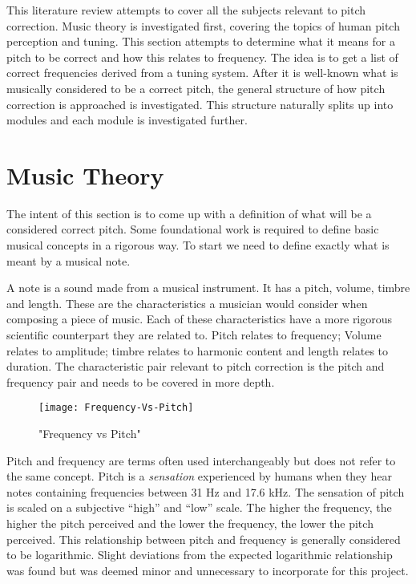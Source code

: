 
This literature review attempts to cover all the subjects relevant to pitch
correction. Music theory is investigated first, covering the topics of human pitch
perception and tuning. This section attempts to determine what it means for a
pitch to be correct and how this relates to frequency. The idea is to get a list
of correct frequencies derived from a tuning system. After it is well-known what
is musically considered to be a correct pitch, the general structure of how pitch
correction is approached is investigated. This structure naturally splits up into
modules and each module is investigated further.

\section{Music Theory}

The intent of this section is to come up with a definition of what will be a
considered correct pitch. Some foundational work is required to define basic
musical concepts in a rigorous way. To start we need to define exactly what is
meant by a musical note.

A note is a sound made from a musical instrument. It has a pitch, volume, timbre
and length. These are the characteristics a musician would consider when composing
a piece of music. Each of these characteristics have a more rigorous scientific
counterpart they are related to. Pitch relates to frequency; Volume relates to
amplitude; timbre relates to harmonic content and length relates to duration. The
characteristic pair relevant to pitch correction is the pitch and frequency pair
and needs to be covered in more depth.

\begin{wrapfigure}{L}{0.5\textwidth}
\texttt{[image: Frequency-Vs-Pitch]}
\caption{"Frequency vs Pitch"}
\label{fig:FrequencyVsPitch}
\end{wrapfigure}

Pitch and frequency are terms often used interchangeably but does not refer to the
same concept. Pitch is a \textit{sensation} experienced by humans when they hear
notes containing frequencies between 31 Hz and 17.6 kHz\cite{Hearing}. The
sensation of pitch is scaled on a subjective ``high'' and ``low'' scale. The
higher the frequency, the higher the pitch perceived and the lower the frequency,
the lower the pitch perceived. This relationship between pitch and frequency is
generally considered to be logarithmic. Slight deviations from the expected
logarithmic relationship was found\cite{PitchVsFrequency} but was deemed minor
and unnecessary to incorporate for this project.

